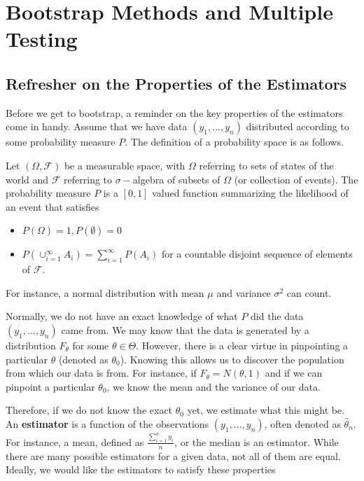 
\chapter{Bootstrap Methods and Multiple Testing}
\section{Refresher on the Properties of the Estimators}
Before we get to bootstrap, a reminder on the key properties of the estimators come in handy. Assume that we have data $(y_1,...,y_n)$ distributed according to some probability measure $P$. The definition of a probability space is as follows.
\begin{mdframed}[backgroundcolor=blue!5] 
\begin{definition}
Let $(\Omega, \mathcal{F})$ be a measurable space, with $\Omega$ referring to sets of states of the world and $\mathcal{F}$ referring to $\sigma-$algebra of subsets of $\Omega$ (or collection of events). The probability measure $P$ is a $[0,1]$ valued function summarizing the likelihood of an event that satisfies
\begin{itemize}
\item $P(\Omega)=1, P(\emptyset)=0$
\item $P\left(\cup_{i=1}^\infty A_i\right)=\sum_{i=1}^\infty P(A_i)$ for a countable disjoint sequence of elements of $\mathcal{F}$. 
\end{itemize}
For instance, a normal distribution with mean $\mu$ and variance $\sigma^2$ can count.
\end{definition}
\end{mdframed}\par
Normally, we do not have an exact knowledge of what $P$ did the data $(y_1,...,y_n)$ came from. We may know that the data is generated by a distribution $F_\theta$ for some $\theta\in\Theta$. However, there is a clear virtue in pinpointing a particular $\theta$ (denoted as $\theta_0$). Knowing this allows us to discover the population from which our data is from. For instance, if $F_\theta = N(\theta,1)$ and if we can pinpoint a particular $\theta_0$, we know the mean and the variance of our data. \par
Therefore, if we do not know the exact $\theta_0$ yet, we estimate what this might be. An \textbf{estimator} is a function of the observations $(y_1,...,y_n)$, often denoted as $\hat{\theta}_n$. For instance, a mean, defined as $\frac{\sum_{i=1}^n y_i}{n}$, or the median is an estimator. While there are many possible estimators for a given data, not all of them are equal. Ideally, we would like the estimators to satisfy these properties
